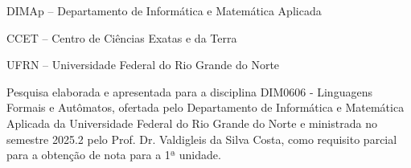 
\instituicao
{
   DIMAp -- Departamento de Informática e Matemática Aplicada\par
   CCET -- Centro de Ciências Exatas e da Terra\par
   UFRN -- Universidade Federal do Rio Grande do Norte }

\comentario
{
   Pesquisa elaborada e apresentada para a disciplina DIM0606 - Linguagens Formais e Autômatos, ofertada pelo Departamento de Informática e Matemática Aplicada da Universidade Federal do Rio Grande do Norte e ministrada no semestre 2025.2 pelo Prof. Dr. Valdigleis da Silva Costa, como requisito parcial para a obtenção de nota para a 1ª unidade.   %
}


\folhaderosto